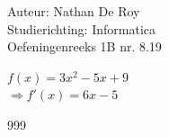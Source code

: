 \documentclass[a4paper]{article}
\begin{document}
  
\noindent \large Auteur: Nathan De Roy \\
\noindent \large Studierichting: Informatica\\
\noindent \large Oefeningenreeks 1B nr. 8.19\\

\medskip

\normalsize

$f(x) = 3x^2 - 5x + 9$\\

$\Rightarrow f'(x) = 6x - 5$\\

\begin{thebibliography}{999}
\end{thebibliography}
\end{document}
